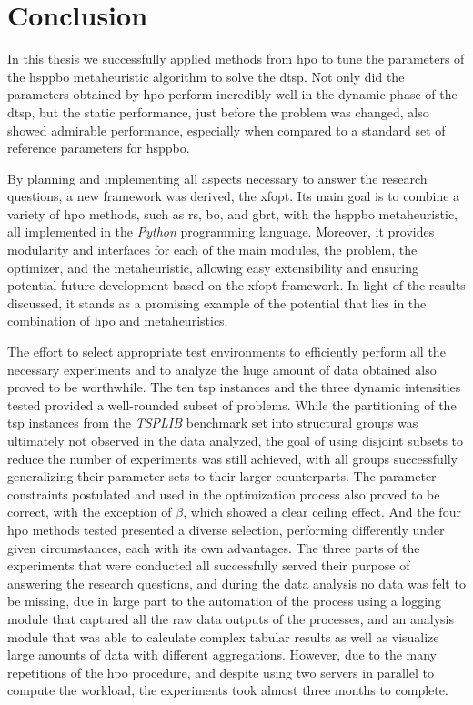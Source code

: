 

\chapter{Conclusion}
\label{chap:conclusion}

\glsresetall

In this thesis we successfully applied methods from \gls{hpo} to tune the parameters of the \gls{hsppbo} metaheuristic algorithm to solve the \gls{dtsp}. 
Not only did the parameters obtained by \gls{hpo} perform incredibly well in the dynamic phase of the \gls{dtsp}, but the static performance, just before the problem was changed, also showed admirable performance, especially when compared to a standard set of reference parameters for \gls{hsppbo}.

By planning and implementing all aspects necessary to answer the research questions, a new framework was derived, the \gls{xfopt}. Its main goal is to combine a variety of \gls{hpo} methods, such as \gls{rs}, \gls{bo}, and \gls{gbrt}, with the \gls{hsppbo} metaheuristic, all implemented in the \textit{Python} programming language. Moreover, it provides modularity and interfaces for each of the main modules, the problem, the optimizer, and the metaheuristic, allowing easy extensibility and ensuring potential future development based on the \gls{xfopt} framework. 
In light of the results discussed, it stands as a promising example of the potential that lies in the combination of \gls{hpo} and metaheuristics.

The effort to select appropriate test environments to efficiently perform all the necessary experiments and to analyze the huge amount of data obtained also proved to be worthwhile. The ten \gls{tsp} instances and the three dynamic intensities tested provided a well-rounded subset of problems. While the partitioning of the \gls{tsp} instances from the  \textit{TSPLIB} benchmark set into structural groups was ultimately not observed in the data analyzed, the goal of using disjoint subsets to reduce the number of experiments was still achieved, with all groups successfully generalizing their parameter sets to their larger counterparts. The parameter constraints postulated and used in the optimization process also proved to be correct, with the exception of $\beta$, which showed a clear ceiling effect. And the four \gls{hpo} methods tested presented a diverse selection, performing differently under given circumstances, each with its own advantages. The three parts of the experiments that were conducted all successfully served their purpose of answering the research questions, and during the data analysis no data was felt to be missing, due in large part to the automation of the process using a logging module that captured all the raw data outputs of the processes, and an analysis module that was able to calculate complex tabular results as well as visualize large amounts of data with different aggregations. However, due to the many repetitions of the \gls{hpo} procedure, and despite using two servers in parallel to compute the workload, the experiments took almost three months to complete.

